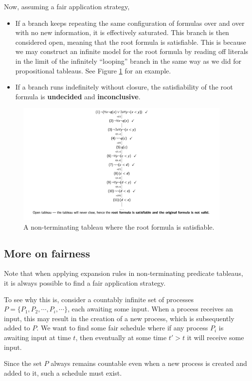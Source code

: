 Now, assuming a fair application strategy,
%
\begin{itemize}
    \item If a branch keeps repeating the same configuration of formulas over and over with no new information, it is effectively saturated. This branch is then considered open, meaning that the root formula is satisfiable. This is because we may construct an infinite model for the root formula by reading off literals in the limit of the infinitely ``looping'' branch in the same way as we did for propositional tableaus. See Figure \ref{fig:Ch04-non-terminating-tableau} for an example.
    \item If a branch runs indefinitely without closure, the satisfiability of the root formula is \textbf{undecided} and \textbf{inconclusive}.
\end{itemize}


\begin{figure}[H]
    \centering
    \includegraphics[width=0.95\textwidth]{Images/04a_NonterminatingPredicateTableau.png}
    \caption{A non-terminating tableau where the root formula is satisfiable.}
    \label{fig:Ch04-non-terminating-tableau}
\end{figure}



\subsection{More on fairness}

Note that when applying expansion rules in non-terminating predicate tableaus, it is always possible to find a fair application strategy.

To see why this is, consider a countably infinite set of processes \(P = \{P_1, P_2, \cdots, P_i, \cdots\}\), each awaiting some input. When a process receives an input, this may result in the creation of a new process, which is subsequently added to \(P\). We want to find some fair schedule where if any process \(P_i\) is awaiting input at time \(t\), then eventually at some time \(t' > t\) it will receive some input.

Since the set \(P\) always remains countable even when a new process is created and added to it, such a schedule must exist.
